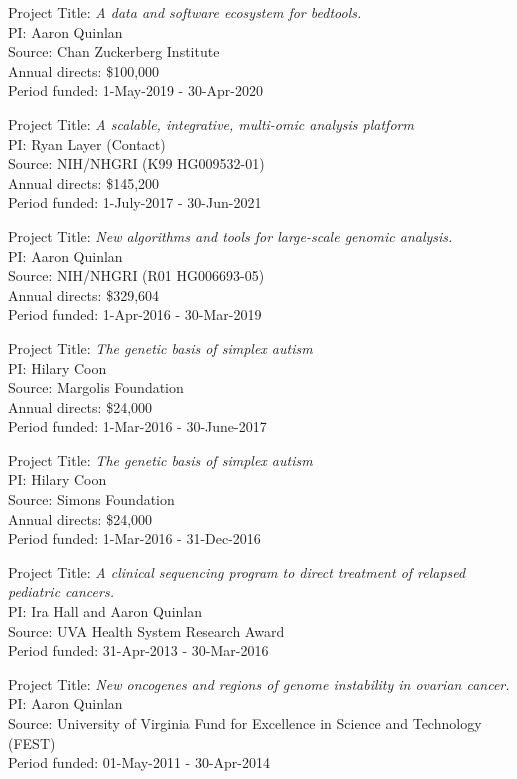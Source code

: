 \documentclass[margin,line]{cv}
\begin{document}
\begin{resume}
    Project Title: \textit{A data and software ecosystem for bedtools.} \\
    PI: Aaron Quinlan \\
    Source: Chan Zuckerberg Institute \\
    Annual directs: \$100,000 \\
    Period funded: 1-May-2019 - 30-Apr-2020

    Project Title: \textit{A scalable, integrative, multi-omic analysis platform} \\
    PI: Ryan Layer (Contact) \\
    Source: NIH/NHGRI (K99 HG009532-01) \\
    Annual directs: \$145,200 \\
    Period funded: 1-July-2017 - 30-Jun-2021 

    Project Title: \textit{New algorithms and tools for large-scale genomic analysis.} \\
    PI: Aaron Quinlan \\
    Source: NIH/NHGRI (R01 HG006693-05) \\
    Annual directs: \$329,604 \\
    Period funded: 1-Apr-2016 - 30-Mar-2019 

    Project Title: \textit{The genetic basis of simplex autism} \\
    PI: Hilary Coon \\
    Source: Margolis Foundation \\
    Annual directs: \$24,000 \\
    Period funded: 1-Mar-2016 - 30-June-2017

    Project Title: \textit{The genetic basis of simplex autism} \\
    PI: Hilary Coon \\
    Source: Simons Foundation \\
    Annual directs: \$24,000 \\
    Period funded: 1-Mar-2016 - 31-Dec-2016

    Project Title: \textit{A clinical sequencing program to direct treatment of relapsed pediatric cancers.} \\
    PI: Ira Hall and Aaron Quinlan \\
    Source: UVA Health System Research Award  \\
    Period funded: 31-Apr-2013 - 30-Mar-2016

    \vspace{-2mm}
    Project Title: \textit{New oncogenes and regions of genome instability in ovarian cancer.} \\
    PI: Aaron Quinlan \\
    Source: University of Virginia Fund for Excellence in Science and Technology (FEST) \\
    Period funded: 01-May-2011 - 30-Apr-2014


\end{resume}
\end{document}
